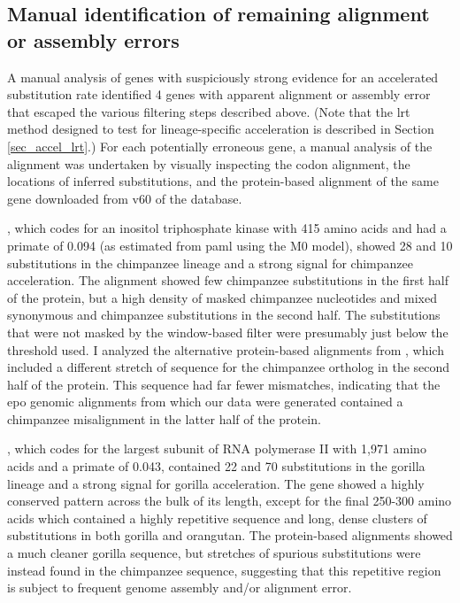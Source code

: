 \subsection{Manual identification of remaining alignment or assembly errors}

A manual analysis of genes with suspiciously strong evidence for an
accelerated \nsyn substitution rate identified 4 genes with apparent
alignment or assembly error that escaped the various filtering steps
described above. (Note that the \ac{lrt} method designed to test for
lineage-specific acceleration is described in Section
\ref{sec_accel_lrt}.) For each potentially erroneous gene, a manual
analysis of the alignment was undertaken by visually inspecting the
codon alignment, the locations of inferred substitutions, and the
protein-based alignment of the same gene downloaded from v60 of the
\ens \cmp database.

, which codes for an inositol triphosphate kinase with 415
amino acids and had a primate \dnds of 0.094 (as estimated from
\ac{paml} using the M0 model), showed 28 \nsyn and 10 \syn
substitutions in the chimpanzee lineage and a strong signal for
chimpanzee acceleration. The alignment showed few chimpanzee
substitutions in the first half of the protein, but a high density of
masked chimpanzee nucleotides and mixed synonymous and \nsyn
chimpanzee substitutions in the second half. The substitutions that
were not masked by the window-based filter were presumably just below
the threshold used. I analyzed the alternative protein-based
alignments from \ens \cmp, which included a different stretch of
sequence for the chimpanzee  ortholog in the second half
of the protein. This sequence had far fewer mismatches, indicating
that the \ac{epo} genomic alignments from which our data were
generated contained a chimpanzee misalignment in the latter half of
the protein.

, which codes for the largest subunit of RNA polymerase
II with 1,971 amino acids and a primate \dnds of 0.043, contained 22
\nsyn and 70 \syn substitutions in the gorilla lineage and a strong
signal for gorilla \dn acceleration. The gene showed a highly
conserved pattern across the bulk of its length, except for the final
250-300 amino acids which contained a highly repetitive sequence and
long, dense clusters of substitutions in both gorilla and
orangutan. The protein-based alignments showed a much cleaner gorilla
sequence, but stretches of spurious substitutions were instead found
in the chimpanzee sequence, suggesting that this repetitive region is
subject to frequent genome assembly and/or alignment error.

